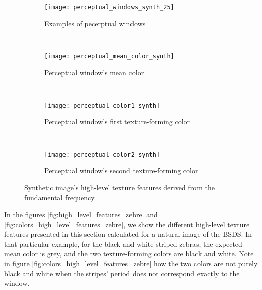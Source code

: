 \begin{figure}[!ht]
    \centering
    \begin{subfigure}[b]{\textwidth}
    	\texttt{[image: perceptual\_windows\_synth\_25]}
        \caption{Examples of pecerptual windows}
        \label{fig:perceptual_windows_synth_25}
    \end{subfigure}\\
    \begin{subfigure}[b]{\textwidth}
    	\texttt{[image: perceptual\_mean\_color\_synth]}
        \caption{Perceptual window's mean color}
        \label{fig:perceptual_mean_color_synth}
    \end{subfigure}\\
    \begin{subfigure}[b]{\textwidth}
    	\texttt{[image: perceptual\_color1\_synth]}
        \caption{Perceptual window's first texture-forming color}
        \label{fig:perceptual_color1_synth}
    \end{subfigure}\\
    \begin{subfigure}[b]{\textwidth}
    	\texttt{[image: perceptual\_color2\_synth]}
        \caption{Perceptual window's second texture-forming color}
        \label{fig:perceptual_color2_synth}
    \end{subfigure}    
                  
    \caption{Synthetic image's high-level texture features derived from the fundamental frequency.}\label{fig:colors_high_level_features_synth}    
\end{figure}


In the figures \ref{fig:high_level_features_zebre} and \ref{fig:colors_high_level_features_zebre}, we show the different high-level texture features presented in this section calculated for a natural image of the BSDS. In that particular example, for the black-and-white striped zebras, the expected mean color is grey, and the two texture-forming colors are black and white. Note in figure \ref{fig:colors_high_level_features_zebre} how the two colors are not purely black and white when the stripes' period does not correspond exactly to the window.

